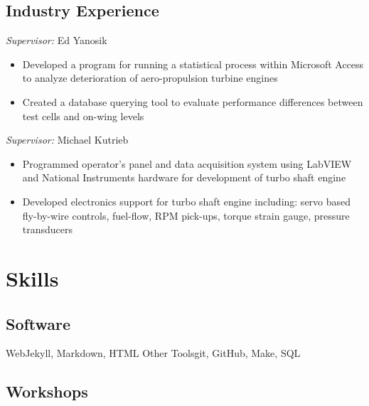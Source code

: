\documentclass[11pt,letterpaper,sans]{moderncv}
\begin{document}
\subsection{Industry Experience}

%
  {\textit{Supervisor:} Ed Yanosik
  \begin{itemize}
  	\item Developed a program for running a statistical process within Microsoft Access to analyze deterioration of aero-propulsion turbine engines
	\item Created a database querying tool to evaluate performance differences between test cells and on-wing levels
  \end{itemize}
  }

%
  {\textit{Supervisor:} Michael Kutrieb
  \begin{itemize}
  	\item Programmed operator's panel and data acquisition system using LabVIEW and National Instruments hardware for development of turbo shaft engine
	\item Developed electronics support for turbo shaft engine including: servo based fly-by-wire controls, fuel-flow, RPM pick-ups, torque strain gauge, pressure transducers
  \end{itemize}
  }

\section{Skills}

\subsection{Software}

           {Web}{Jekyll, Markdown, HTML}
           {Other Tools}{git, GitHub, Make, SQL}

\subsection{Workshops}

\end{document}
